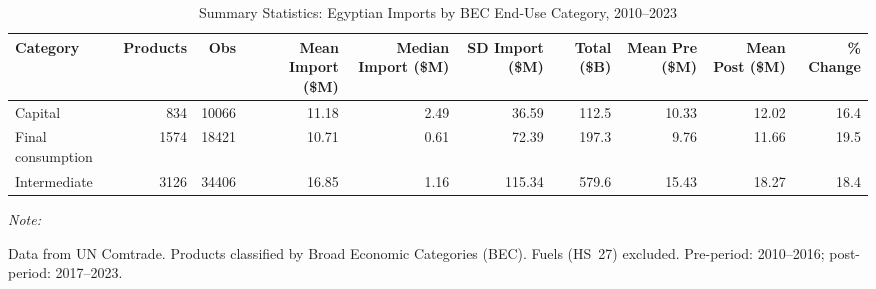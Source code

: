 \begin{table}[!h]
\centering
\caption{\label{tab:tab:summary}Summary Statistics: Egyptian Imports by BEC End-Use Category, 2010--2023}
\centering
\begin{threeparttable}
\begin{tabular}[t]{lrrrrrrrrr}
\toprule
Category & Products & Obs & Mean Import (\$M) & Median Import (\$M) & SD Import (\$M) & Total (\$B) & Mean Pre (\$M) & Mean Post (\$M) & \% Change\\
\midrule
Capital & 834 & 10066 & 11.18 & 2.49 & 36.59 & 112.5 & 10.33 & 12.02 & 16.4\\
Final consumption & 1574 & 18421 & 10.71 & 0.61 & 72.39 & 197.3 & 9.76 & 11.66 & 19.5\\
Intermediate & 3126 & 34406 & 16.85 & 1.16 & 115.34 & 579.6 & 15.43 & 18.27 & 18.4\\
\bottomrule
\end{tabular}
\begin{tablenotes}
\item \textit{Note: } 
\item Data from UN Comtrade. Products classified by Broad Economic Categories (BEC). Fuels (HS~27) excluded. Pre-period: 2010--2016; post-period: 2017--2023.
\end{tablenotes}
\end{threeparttable}
\end{table}

